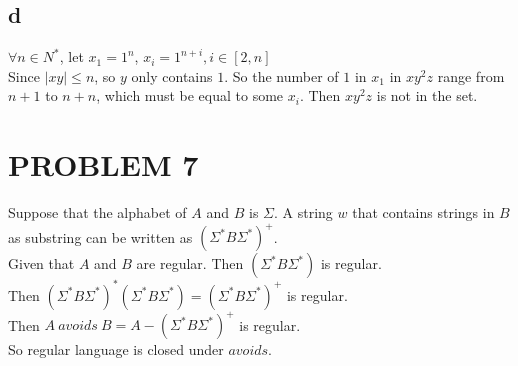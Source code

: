 \documentclass{ctexart}
\begin{document}
\subsection{d}
$\forall n \in N^* $, let $x_1=1^n$, $x_i=1^{n+i}, i\in [2,n]$\\
Since $|xy|\leq n$, so $y$ only contains $1$. So the number of $1$ in $x_1$ in $xy^2z$
range from $n+1$ to $n+n$, which must be equal to some $x_i$. Then $xy^2z$ is not
in the set.

\section{PROBLEM 7}
Suppose that the alphabet of $A$ and $B$ is $\Sigma$. A string $w$ that contains 
strings in $B$ as substring can be written as $(\Sigma^*B\Sigma^*)^+$.\\
Given that $A$ and $B$ are regular. Then $(\Sigma^*B\Sigma^*)$ is regular.\\
Then $(\Sigma^*B\Sigma^*)^*(\Sigma^*B\Sigma^*)=(\Sigma^*B\Sigma^*)^+ $ is regular.\\
Then $A\ avoids\ B = A - (\Sigma^*B\Sigma^*)^+$ is regular.\\
So regular language is closed under $avoids$.
\end{document}
